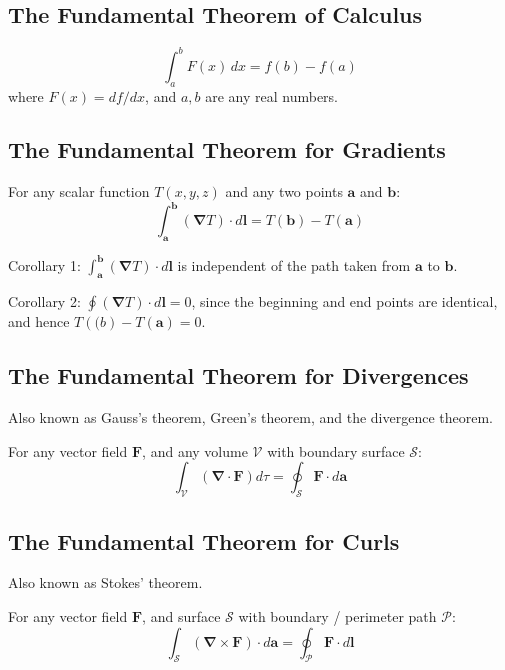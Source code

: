 \documentclass[a4paper]{article}
\theoremstyle{plain}
\theoremstyle{definition}
\newcommand{\vect}[1]{\textbf{#1}}
\newcommand{\del}{\bm{\nabla}}
\begin{document}
\subsection{The Fundamental Theorem of Calculus}

\begin{equation}
\int_{a}^{b} F(x) \,dx = f(b) - f(a)
\end{equation}
where $F(x) = df/dx$, and $a,b$ are any real numbers.

\subsection{The Fundamental Theorem for Gradients}
\label{sec:ftocgrad}

For any scalar function $T(x,y,z)$ and any two points $\vect{a}$ and
$\vect{b}$:
\begin{equation}
\int_{\vect{a}}^{\vect{b}} (\del T) \cdot d\vect{l} = T(\vect{b}) - T(\vect{a})
\end{equation}

Corollary 1: $\int_{\vect{a}}^{\vect{b}} (\del T) \cdot d\vect{l}$ is
independent of the path taken from $\vect{a}$ to $\vect{b}$.

Corollary 2: $\oint (\del T) \cdot d\vect{l} = 0$, since the beginning
and end points are identical, and hence $T(\vect(b) - T(\vect{a}) =
0$.

\subsection{The Fundamental Theorem for Divergences}
\label{sec:gaussthm}

Also known as Gauss's theorem, Green's theorem, and the divergence
theorem.

For any vector field $\vect{F}$, and any volume $\mathcal{V}$ with
boundary surface $\mathcal{S}$:
\begin{equation}
\int_{\mathcal{V}} (\del \cdot \vect{F}) d\tau = \oint_{\mathcal{S}} \vect{F} \cdot d\vect{a}
\end{equation}

\subsection{The Fundamental Theorem for Curls}
\label{sec:stokesthm}

Also known as Stokes' theorem.

For any vector field $\vect{F}$, and surface $\mathcal{S}$ with
boundary / perimeter path $\mathcal{P}$:
\begin{equation}
\int_{\mathcal{S}} (\del \times \vect{F}) \cdot d\vect{a} = \oint_{\mathcal{P}} \vect{F} \cdot d\vect{l}
\end{equation}
\end{document}
